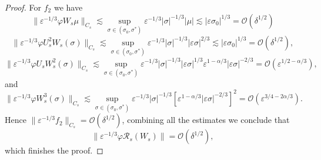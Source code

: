 \documentclass[letterpaper,11pt]{article}
\newcommand{\Ral}{\mathcal{R}}
\newcommand{\rmO}{\mathcal{O}}
\newcommand{\eps}{\varepsilon}
\newcommand{\lar}{ \lesssim }
\numberwithin{equation}{section}
\theoremstyle{plain}
\begin{document}
\begin{proof}
For $f_2$ we have
\[
\|\eps^{-1/3}\varphi W_s\mu\|_{C_s} \lar \sup_{\sigma \in (\sigma_0, \sigma^{*})} \eps^{-1/3}|\sigma|^{-1/3}|\mu| \lar |\eps \sigma_0|^{1/3} = \rmO(\delta^{1/2})
\]
\[
\|\eps^{-1/3}\varphi U_s^2W_s(\sigma) \|_{C_s}  \lar \sup_{\sigma \in (\sigma_0, \sigma^{*})}\eps^{-1/3}|\sigma|^{-1/3} |\eps \sigma|^{2/3} \lar |\eps \sigma_0|^{1/3}= \rmO(\delta^{1/2}),
\]
\[
\|\eps^{-1/3}\varphi U_sW_s^2(\sigma) \|_{C_s}  \lar \sup_{\sigma \in (\sigma_0, \sigma^{*})}\eps^{-1/3}|\sigma|^{-1/3} |\eps \sigma|^{1/3}\eps^{1-\alpha/3}|\eps\sigma|^{-2/3} = \rmO(\eps^{1/2-\alpha/3}),
\]
and
\[
\|\eps^{-1/3}\varphi W_s^3(\sigma) \|_{C_s}  \lar \sup_{\sigma \in (\sigma_0, \sigma^{*})}\eps^{-1/3}|\sigma|^{-1/3} [\eps^{1-\alpha/3}|\eps\sigma|^{-2/3}]^2 = \rmO(\eps^{3/4-2\alpha/3}).
\]
Hence $\|\eps^{-1/3}f_2\|_{C_s} = \rmO(\delta^{1/2})$, combining all the estimates we conclude that 
\[
\|\eps^{-1/3}\varphi \Ral_s(W_s) \| = \rmO(\delta^{1/2}),
\]
which finishes the proof.
\end{proof}
\end{document}
